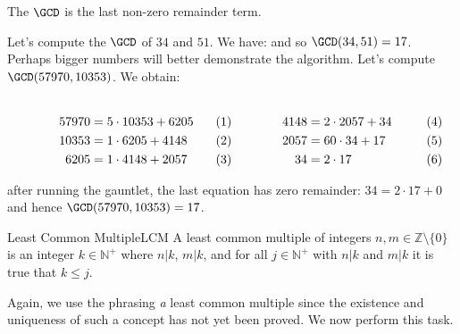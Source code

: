     \par\vspace{2.5ex}
    The $\GCD$ is the last non-zero remainder term.
    \begin{example}
        Let's compute the $\GCD$ of $34$ and $51$. We have:
        and so $\GCD(34,51)=17$. Perhaps bigger numbers will better
        demonstrate the algorithm. Let's compute $\GCD(57970,10353)$. We
        obtain:
        \par
        \begin{subequations}
            \begin{minipage}[b]{0.49\textwidth}
                \centering
                \begin{align}
                    57970&=5\cdot{10353}+6205\\
                    10353&=1\cdot{6205}+4148\\
                    6205&=1\cdot{4148}+2057
                \end{align}
            \end{minipage}
            \hfill
            \begin{minipage}[b]{0.49\textwidth}
                \centering
                \begin{align}
                    4148&=2\cdot{2057}+34\\
                    2057&=60\cdot{34}+17\\
                    34&=2\cdot{17}
                \end{align}
            \end{minipage}
        \end{subequations}
        \par\vspace{2.5ex}
        after running the gauntlet, the last equation has zero
        remainder: $34=2\cdot{17}+0$ and hence $\GCD(57970,10353)=17$.
    \end{example}
    \begin{fdefinition}{Least Common Multiple}{LCM}
        A least common multiple of integers
        $n,m\in\mathbb{Z}\setminus\{0\}$ is an integer
        $k\in\mathbb{N}^{+}$ where $n|k$, $m|k$, and for all
        $j\in\mathbb{N}^{+}$ with $n|k$ and $m|k$ it is true that
        $k\leq{j}$.
    \end{fdefinition}
    Again, we use the phrasing \textit{a} least common multiple since
    the existence and uniqueness of such a concept has not yet been
    proved. We now perform this task.
